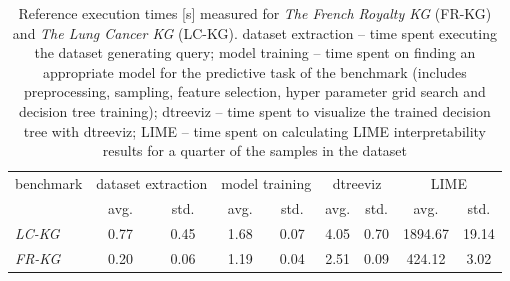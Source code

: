 \begin{table}
    \centering
    \begin{tabular}{l|cccccccc}
        \toprule
        benchmark & \multicolumn{2}{c}{dataset extraction} & \multicolumn{2}{c}{model training} & \multicolumn{2}{c}{dtreeviz} & \multicolumn{2}{c}{LIME} \\
        & avg. & std. & avg. & std. & avg. & std. & avg. & std. \\
        \midrule
        \midrule
        \textit{LC-KG} & 0.77 & 0.45 & 1.68 & 0.07 & 4.05 & 0.70 & 1894.67 & 19.14 \\
        \textit{FR-KG} & 0.20 & 0.06 & 1.19 & 0.04 & 2.51 & 0.09 & 424.12 & 3.02\\
        \bottomrule
    \end{tabular}
    \caption{Reference execution times [s] measured for \textit{The French Royalty KG} (FR-KG) and \textit{The Lung Cancer KG} (LC-KG). dataset extraction -- time spent executing the dataset generating query; model training -- time spent on finding an appropriate model for the predictive task of the benchmark (includes preprocessing, sampling, feature selection, hyper parameter grid search and decision tree training); dtreeviz -- time spent to visualize the trained decision tree with dtreeviz; LIME -- time spent on calculating LIME interpretability results for a quarter of the samples in the dataset}
    \label{fig:benchmark_reference_times}
\end{table}


